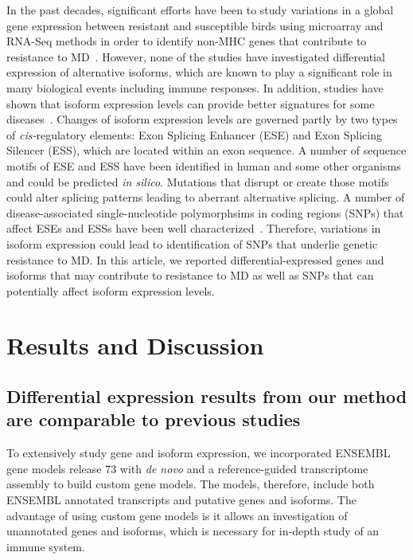 \documentclass[10pt]{article}
\begin{document}
In the past decades, significant efforts have been to study
variations in a global gene expression between resistant and
susceptible birds using microarray and RNA-Seq methods in order
to identify non-MHC genes that contribute to resistance to
MD~\cite{sarson2008transcriptional,morgan2001induction,vallejo1998genetic,yonash1999high,bumstead1998genomic}.
However, none of the studies have investigated differential
expression of alternative isoforms, which are known to play a
significant role in many biological events including immune
responses.  In addition, studies have shown that isoform
expression levels can provide better signatures for some
diseases~\cite{zhang2013isoform}.  Changes of isoform expression
levels are governed partly by two types of {\em cis-}regulatory
elements: Exon Splicing Enhancer (ESE) and Exon Splicing Silencer
(ESS), which are located within an exon sequence.  A number of
sequence motifs of ESE and ESS have been identified in human and
some other organisms and could be predicted {\em in silico}.
Mutations that disrupt or create those motifs could alter
splicing patterns leading to aberrant alternative splicing.  A
number of disease-associated single-nucleotide polymorphsims in
coding regions (SNPs) that affect ESEs and ESSs have been well
characterized~\cite{blencowe2000exonic, wang2007splicing}.
Therefore, variations in isoform expression could lead to
identification of SNPs that underlie genetic resistance to MD.
In this article, we reported differential-expressed genes and
isoforms that may contribute to resistance to MD as well as SNPs
that can potentially affect isoform expression levels.

\section*{Results and Discussion}

\subsection*{Differential expression results from our method are comparable to
previous studies}

To extensively study gene and isoform expression, we incorporated
ENSEMBL gene models release 73 with {\em de novo} and a
reference-guided transcriptome assembly to build custom gene
models.  The models, therefore, include both ENSEMBL annotated
transcripts and putative genes and isoforms.  The advantage of
using custom gene models is it allows an investigation of
unannotated genes and isoforms, which is necessary for in-depth
study of an immune system.
\end{document}
